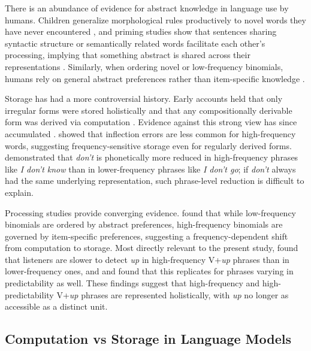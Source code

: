 \documentclass[11pt]{article}
\begin{document}
There is an abundance of evidence for abstract knowledge in language use
by humans. Children generalize morphological rules productively to novel
words they have never encountered
\citep{berkoChildsLearningEnglish1958}, and priming studies show that
sentences sharing syntactic structure or semantically related words
facilitate each other's processing, implying that something abstract is
shared across their representations
\citep{bock1986syntacticpersistencelanguage, meyer1971facilitationrecognizingpairs}.
Similarly, when ordering novel or low-frequency binomials, humans rely
on general abstract preferences rather than item-specific knowledge
\citep{morgan2016abstractknowledgedirect}.

Storage has had a more controversial history. Early accounts held that
only irregular forms were stored holistically and that any
compositionally derivable form was derived via computation
\citep{pinkerFutureTense2002}. Evidence against this strong view has
since accumulated
\citep{kapatsinski2010frequencyuseleads, bybeeEffectUsageDegrees1999, morgan2016abstractknowledgedirect, houghton2025multiwordrepresentationsminds, stembergerAreInflectedForms2004}.
\citet{stembergerAreInflectedForms2004} showed that inflection errors
are less common for high-frequency words, suggesting frequency-sensitive
storage even for regularly derived forms.
\citet{bybeeEffectUsageDegrees1999} demonstrated that \emph{don't} is
phonetically more reduced in high-frequency phrases like \emph{I don't
know} than in lower-frequency phrases like \emph{I don't go}; if
\emph{don't} always had the same underlying representation, such
phrase-level reduction is difficult to explain.

Processing studies provide converging evidence.
\citet{morgan2016abstractknowledgedirect} found that while low-frequency
binomials are ordered by abstract preferences, high-frequency binomials
are governed by item-specific preferences, suggesting a
frequency-dependent shift from computation to storage. Most directly
relevant to the present study, \citet{kapatsinski2010frequencyuseleads}
found that listeners are slower to detect \emph{up} in high-frequency
V+\emph{up} phrases than in lower-frequency ones, and
\citet{houghton2025multiwordrepresentationsminds} and found that this
replicates for phrases varying in predictability as well. These findings
suggest that high-frequency and high-predictability V+\emph{up} phrases
are represented holistically, with \emph{up} no longer as accessible as
a distinct unit.

\subsection{Computation vs Storage in Language
Models}\label{computation-vs-storage-in-language-models}
\end{document}
